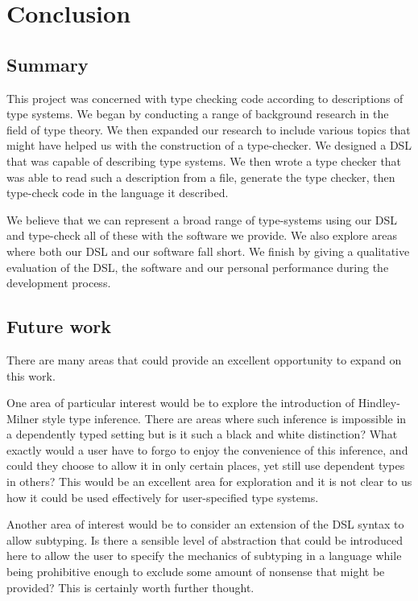 \chapter{Conclusion}

\section{Summary}

This project was concerned with type checking code according to
descriptions of type systems. We began
by conducting a range of background research in the field of
type theory. We then expanded our research to include various topics
that might have helped us with the construction of a type-checker. We
designed a DSL that was capable of describing type systems. We then
wrote a type checker that was able to read such a description from a 
file, generate the type checker, then type-check code in the language it
described.

We believe that we can represent a broad range of
type-systems using our DSL and type-check all of these with the software we
provide. We also explore areas where both our DSL and our software
fall short. We finish by giving a qualitative evaluation of the DSL,
the software and our personal performance during the development
process. 

\section{Future work}

There are many areas that could provide an excellent opportunity to
expand on this work.

One area of particular interest would be to explore the introduction
of Hindley-Milner style type inference. There are areas where
such inference is impossible in a dependently typed setting but is it
such a black and white distinction? What exactly would a user have to
forgo to enjoy the convenience of this inference, and could
they choose to allow it in only certain places, yet still use
dependent types in others? This would be an excellent area for
exploration and it is not clear to us how it could be used effectively
for user-specified type systems.

Another area of interest would be to consider an extension of the DSL
syntax to allow subtyping. Is there a sensible level of abstraction
that could be introduced here to allow the user to specify the
mechanics of subtyping in a language while being prohibitive enough to
exclude some amount of nonsense that might be provided? This is
certainly worth further thought.


